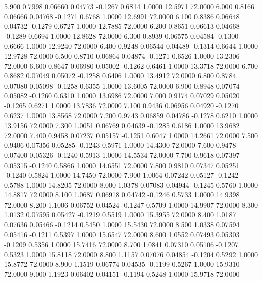    5.900   0.7998   0.06660   0.04773  -0.1267   0.6814   1.0000  12.5971  72.0000
   6.000   0.8166   0.06666   0.04768  -0.1271   0.6768   1.0000  12.6991  72.0000
   6.100   0.8386   0.06648   0.04732  -0.1279   0.6727   1.0000  12.7885  72.0000
   6.200   0.8651   0.06613   0.04668  -0.1289   0.6694   1.0000  12.8628  72.0000
   6.300   0.8939   0.06575   0.04584  -0.1300   0.6666   1.0000  12.9240  72.0000
   6.400   0.9248   0.06544   0.04489  -0.1314   0.6644   1.0000  12.9728  72.0000
   6.500   0.8710   0.06864   0.04874  -0.1271   0.6526   1.0000  13.2306  72.0000
   6.600   0.8647   0.06980   0.05002  -0.1262   0.6461   1.0000  13.3718  72.0000
   6.700   0.8682   0.07049   0.05072  -0.1258   0.6406   1.0000  13.4912  72.0000
   6.800   0.8784   0.07080   0.05098  -0.1258   0.6355   1.0000  13.6005  72.0000
   6.900   0.8948   0.07074   0.05082  -0.1260   0.6310   1.0000  13.6986  72.0000
   7.000   0.9174   0.07029   0.05020  -0.1265   0.6271   1.0000  13.7836  72.0000
   7.100   0.9436   0.06956   0.04920  -0.1270   0.6237   1.0000  13.8568  72.0000
   7.200   0.9743   0.06859   0.04786  -0.1278   0.6210   1.0000  13.9156  72.0000
   7.300   1.0051   0.06769   0.04639  -0.1285   0.6186   1.0000  13.9682  72.0000
   7.400   0.9458   0.07237   0.05157  -0.1251   0.6047   1.0000  14.2661  72.0000
   7.500   0.9406   0.07356   0.05285  -0.1243   0.5971   1.0000  14.4300  72.0000
   7.600   0.9478   0.07400   0.05326  -0.1240   0.5913   1.0000  14.5534  72.0000
   7.700   0.9618   0.07397   0.05315  -0.1240   0.5866   1.0000  14.6551  72.0000
   7.800   0.9810   0.07347   0.05251  -0.1240   0.5824   1.0000  14.7450  72.0000
   7.900   1.0064   0.07242   0.05127  -0.1242   0.5788   1.0000  14.8205  72.0000
   8.000   1.0378   0.07083   0.04944  -0.1245   0.5760   1.0000  14.8817  72.0000
   8.100   1.0687   0.06918   0.04742  -0.1246   0.5733   1.0000  14.9398  72.0000
   8.200   1.1006   0.06752   0.04524  -0.1247   0.5709   1.0000  14.9907  72.0000
   8.300   1.0132   0.07595   0.05427  -0.1219   0.5519   1.0000  15.3955  72.0000
   8.400   1.0187   0.07636   0.05466  -0.1214   0.5450   1.0000  15.5430  72.0000
   8.500   1.0338   0.07594   0.05416  -0.1211   0.5397   1.0000  15.6547  72.0000
   8.600   1.0552   0.07493   0.05303  -0.1209   0.5356   1.0000  15.7416  72.0000
   8.700   1.0841   0.07310   0.05106  -0.1207   0.5323   1.0000  15.8118  72.0000
   8.800   1.1157   0.07076   0.04854  -0.1204   0.5292   1.0000  15.8772  72.0000
   8.900   1.1519   0.06774   0.04535  -0.1199   0.5267   1.0000  15.9310  72.0000
   9.000   1.1923   0.06402   0.04151  -0.1194   0.5248   1.0000  15.9718  72.0000
